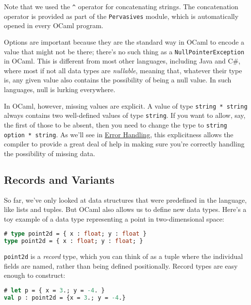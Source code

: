 Note that we used the \passthrough{\lstinline!^!} operator for
concatenating strings. The concatenation operator is provided as part of
the \passthrough{\lstinline!Pervasives!} module, which is automatically
opened in every OCaml program.

Options are important because they are the standard way in OCaml to
encode a value that might not be there; there's no such thing as a
\passthrough{\lstinline!NullPointerException!} in OCaml. This is
different from most other languages, including Java and C\#, where most
if not all data types are \emph{nullable}, meaning that, whatever their
type is, any given value also contains the possibility of being a null
value. In such languages, null is lurking
everywhere.

In OCaml, however, missing values are explicit. A value of type
\passthrough{\lstinline!string * string!} always contains two
well-defined values of type \passthrough{\lstinline!string!}. If you
want to allow, say, the first of those to be absent, then you need to
change the type to \passthrough{\lstinline!string option * string!}. As
we'll see in \href{error-handling.html\#error-handling}{Error Handling},
this explicitness allows the compiler to provide a great deal of help in
making sure you're correctly handling the possibility of missing data.

\hypertarget{records-and-variants}{%
\subsection{Records and Variants}\label{records-and-variants}}

So far, we've only looked at data structures that were predefined in the
language, like lists and tuples. But OCaml also allows us to define new
data types. Here's a toy example of a data type representing a point in
two-dimensional space:

\begin{lstlisting}[language=Caml]
# type point2d = { x : float; y : float }
type point2d = { x : float; y : float; }
\end{lstlisting}

\passthrough{\lstinline!point2d!} is a \emph{record} type, which you can
think of as a tuple where the individual fields are named, rather than
being defined positionally. Record types are easy enough to
construct:

\begin{lstlisting}[language=Caml]
# let p = { x = 3.; y = -4. }
val p : point2d = {x = 3.; y = -4.}
\end{lstlisting}

